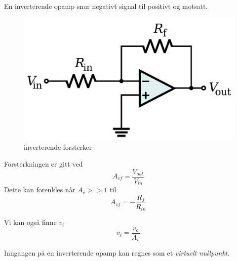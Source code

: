 En inverterende opamp snur negativt signal til positivt og motsatt.

\begin{figure}[H]
  \caption{inverterende forsterker}
  \centering
  \includegraphics[width=\textwidth]{./img/opamp-invert}
\end{figure}

Forsterkningen er gitt ved
$$A_{vf} = \frac{V_{out}}{V_{in}}$$
Dette kan forenkles når $A_v >> 1$ til
$$A_{vf} = -\frac{R_f}{R_{in}}$$

Vi kan også finne $v_i$
$$v_i = \frac{v_o}{A_v}$$

Inngangen på en inverterende opamp kan regnes som et \emph{virtuelt nullpunkt}.
